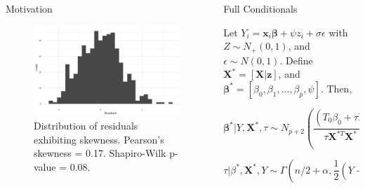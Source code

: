 \documentclass[final]{beamer}
\newlength{\onecolwid}
\newlength{\twocolwid}
\begin{document}
\begin{frame}[t]
\begin{columns}[t]
\begin{column}{\twocolwid}
\begin{columns}[t,totalwidth=\twocolwid]
\begin{column}{\onecolwid}
\begin{block}{Motivation}
\begin{figure}
\includegraphics[width=0.9\linewidth]{skew-resids.png}
\caption{Distribution of residuals exhibiting skewness. Pearson's skewness = 0.17. Shapiro-Wilk p-value = 0.08.}
\end{figure}
\end{block}


\end{column} %

\begin{column}{\onecolwid}\vspace{-.6in} %


\begin{block}{Full Conditionals}

Let $Y_{i} = \mathbf{x}_i \mathbf{\beta} + \psi z_i + \sigma \epsilon$ with $Z \sim N_+(0,1)$, and $\epsilon \sim N(0,1)$. Define $\mathbf{X}^* = [\mathbf{X} | \mathbf{z}]$, and $\mathbf{\beta}^* = [\beta_0, \beta_1,...,\beta_p, \psi]$. Then,

$$\mathbf{\beta}^*|Y,\mathbf{X}^*,\tau \sim N_{p+2}(\frac{(T_0 \beta_0 + \tau \mathbf{X}^{*T}Y)}{\tau \mathbf{X}^{*T}\mathbf{X}^* + T_0},\tau \mathbf{X}^{*T}\mathbf{X}^* + T_0)$$

$$\tau|\beta^*,\mathbf{X}^{*},Y \sim \Gamma(n/2 + \alpha,\frac{1}{2}(Y-\mathbf{X}^*\beta^*)^T(Y-\mathbf{X}^*\beta^*)+b)$$


\end{block}
\end{column}
\end{columns}
\end{column}
\end{columns}
\end{frame}
\end{document}
